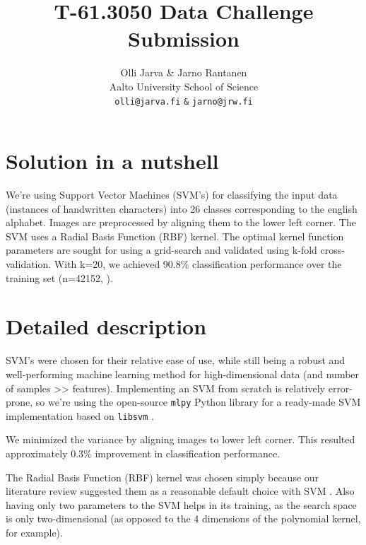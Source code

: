 \documentclass{netsec2012}
\begin{document}

\title{T-61.3050 Data Challenge Submission}

\author{Olli Jarva \& Jarno Rantanen \\
        Aalto University School of Science \\
	\texttt{olli@jarva.fi} \texttt{\&} \texttt{jarno@jrw.fi}}
\maketitle


\section{Solution in a nutshell}

We're using Support Vector Machines (SVM's) for classifying the input data (instances of 
handwritten characters) into 26 classes corresponding to the english alphabet. Images are 
preprocessed by aligning them to the lower left corner. The SVM uses a Radial Basis Function 
(RBF) kernel. The optimal kernel function parameters are sought for using 
a grid-search and validated using k-fold cross-validation. With k=20, we achieved 90.8\% 
classification performance over the training set (n=42152, \cite{training_set}).

\section{Detailed description}

SVM's were chosen for their relative ease of use, while still being a robust and well-performing 
machine learning method for high-dimensional data (and number of samples >> features).  Implementing an SVM from scratch is 
relatively error-prone, so we're using the open-source \texttt{mlpy} \cite{mlpy} Python library for a 
ready-made SVM implementation based on \texttt{libsvm} \cite{libsvm}.

We minimized the variance by aligning images to lower left corner. This resulted approximately 0.3\%
improvement in classification performance.

The Radial Basis Function (RBF) kernel was chosen simply because our literature review suggested 
them as a reasonable default choice with SVM \cite{libsvm_guide,svm_chemistry}.  Also having only two parameters to the SVM helps in 
its training, as the search space is only two-dimensional (as opposed to the 4 dimensions of the 
polynomial kernel, for example). 
\end{document}
